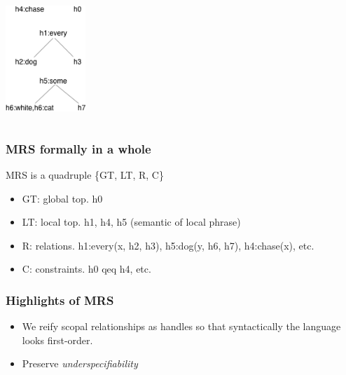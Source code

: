 \documentclass{beamer}
\begin{document}
\begin{frame}
{\begin{columns}

            \includegraphics[height=4cm]{img/unresolved-parse.png}

        \end{columns}
    }

\end{frame}

\begin{frame}
    \frametitle{MRS formally in a whole}

    MRS is a quadruple \{GT, LT, R, C\}

    \begin{itemize}
        \item GT: global top. h0
        \item LT: local top. h1, h4, h5 (semantic of local phrase)
        \item R: relations. h1:every(x, h2, h3), h5:dog(y, h6, h7), h4:chase(x), etc.
        \item C: constraints. h0 qeq h4, etc.
    \end{itemize}
\end{frame}

\begin{frame}
    \frametitle{Highlights of MRS}

    \begin{itemize}
        \item We reify scopal relationships as handles
            so that syntactically the language looks first-order.
        \item Preserve \emph{underspecifiability}
    \end{itemize}
\end{frame}
\end{document}
